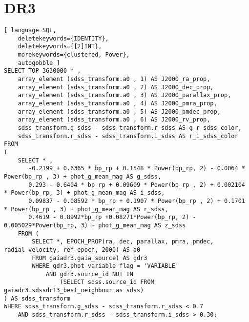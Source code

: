 \section{DR3} \label{apendice:gaiaAdql:dr3}
\begin{lstlisting}[ language=SQL,
	deletekeywords={IDENTITY},
	deletekeywords={[2]INT},
	morekeywords={clustered, Power},
	autogobble ]
SELECT TOP 3630000 * ,
	array_element (sdss_transform.a0 , 1) AS J2000_ra_prop,
	array_element (sdss_transform.a0 , 2) AS J2000_dec_prop,
	array_element (sdss_transform.a0 , 3) AS J2000_parallax_prop,
	array_element (sdss_transform.a0 , 4) AS J2000_pmra_prop,
	array_element (sdss_transform.a0 , 5) AS J2000_pmdec_prop,
	array_element (sdss_transform.a0 , 6) AS J2000_rv_prop,
	sdss_transform.g_sdss - sdss_transform.r_sdss AS g_r_sdss_color,
	sdss_transform.r_sdss - sdss_transform.i_sdss AS r_i_sdss_color
FROM
(
	SELECT * ,
	   -0.2199 + 0.6365 * bp_rp + 0.1548 * Power(bp_rp, 2) - 0.0064 * Power(bp_rp , 3) + phot_g_mean_mag AS g_sdss,
	   0.293 - 0.6404 * bp_rp + 0.09609 * Power(bp_rp , 2) + 0.002104 * Power(bp_rp, 3) + phot_g_mean_mag AS i_sdss,
	   0.09837 - 0.08592 * bp_rp + 0.1907 * Power(bp_rp , 2) + 0.1701 * Power(bp_rp , 3) + phot_g_mean_mag AS r_sdss,
	   0.4619 - 0.8992*bp_rp +0.08271*Power(bp_rp, 2) - 0.005029*Power(bp_rp, 3) + phot_g_mean_mag AS z_sdss
	FROM (
		SELECT *, EPOCH_PROP(ra, dec, parallax, pmra, pmdec, radial_velocity, ref_epoch, 2000) AS a0
		FROM gaiadr3.gaia_source) AS gdr3
		WHERE gdr3.phot_variable_flag = 'VARIABLE'
			AND gdr3.source_id NOT IN
				(SELECT sdss.source_id FROM gaiadr3.sdssdr13_best_neighbour as sdss)
) AS sdss_transform
WHERE sdss_transform.g_sdss - sdss_transform.r_sdss < 0.7
	AND sdss_transform.r_sdss - sdss_transform.i_sdss > 0.30;

\end{lstlisting}